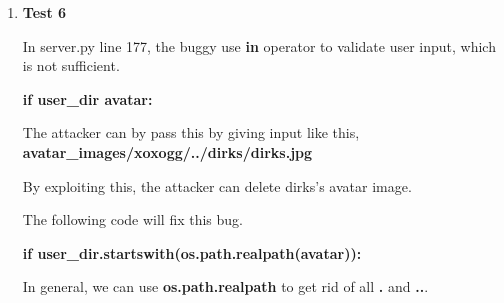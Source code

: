 \documentclass[11pt]{article}
\newenvironment{qparts}{\begin{enumerate}[{(}a{)}]}{\end{enumerate}}
\begin{document}
\begin{qparts}
	In general, we can use prepared statement to construct sql query. The standard library will sanitize input properly.
	
	\item \textbf{Test 6}
	
	In server.py line 177, the buggy use \textbf{in} operator to validate user input, which is not sufficient.
	
	\textbf{if user\_dir  avatar:}
	
	The attacker can by pass this by giving input like this, \textbf{avatar\_images/xoxogg/../dirks/dirks.jpg}
	
	By exploiting this, the attacker can delete dirks's avatar image.
	
	The following code will fix this bug.
	
	\textbf{if user\_dir.startswith(os.path.realpath(avatar)):}
	
	In general, we can use \textbf{os.path.realpath} to get rid of all \textbf{.} and \textbf{..}.

\end{qparts}


\newpage
\end{document}
